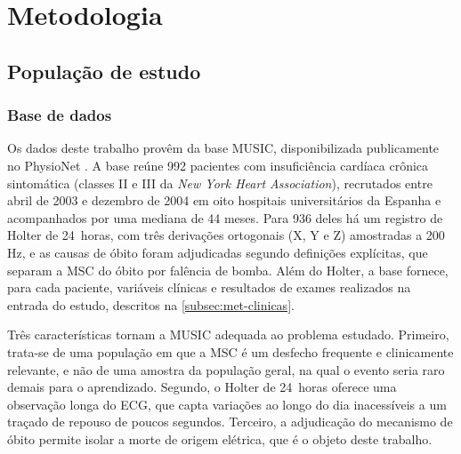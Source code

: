 \chapter{Metodologia}
\label{chap:metodologia}


%

\section{População de estudo}
\label{sec:met-coorte}
\label{sec:intro-dados}

\subsection{Base de dados}
\label{subsec:met-base}

Os dados deste trabalho provêm da base \gls{MUSIC}, disponibilizada
publicamente no PhysioNet \cite{martinyebra2025music, martinyebra2024music}.
A base reúne 992 pacientes com insuficiência cardíaca crônica sintomática
(classes II e III da \textit{New York Heart Association}), recrutados entre
abril de 2003 e dezembro de 2004 em oito hospitais universitários da Espanha
e acompanhados por uma mediana de 44 meses. Para 936 deles há um registro de
Holter de 24~horas, com três derivações ortogonais (X, Y e Z) amostradas a
200\,Hz, e as causas de óbito foram adjudicadas segundo definições
explícitas, que separam a \gls{MSC} do óbito por falência de bomba. Além do
Holter, a base fornece, para cada paciente, variáveis clínicas e resultados
de exames realizados na entrada do estudo, descritos na
\autoref{subsec:met-clinicas}.

Três características tornam a MUSIC adequada ao problema estudado. Primeiro,
trata-se de uma população em que a \gls{MSC} é um desfecho frequente e
clinicamente relevante, e não de uma amostra da população geral, na qual o
evento seria raro demais para o aprendizado. Segundo, o Holter de 24~horas
oferece uma observação longa do \gls{ECG}, que capta variações ao longo do
dia inacessíveis a um traçado de repouso de poucos segundos. Terceiro, a
adjudicação do mecanismo de óbito permite isolar a morte de origem elétrica,
que é o objeto deste trabalho.

